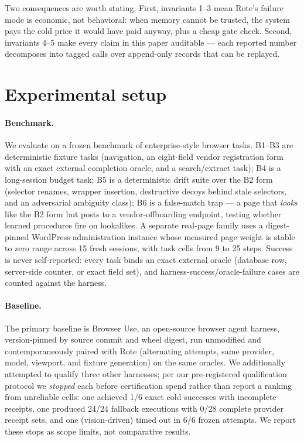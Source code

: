 \documentclass{article} %
\begin{document}
Two consequences are worth stating. First, invariants 1--3 mean Rote's failure mode is
economic, not behavioral: when memory cannot be trusted, the system pays the cold price
it would have paid anyway, plus a cheap gate check. Second, invariants 4--5 make every
claim in this paper auditable --- each reported number decomposes into tagged calls over
append-only records that can be replayed.

\section{Experimental setup}
\label{sec:setup}

\paragraph{Benchmark.} We evaluate on a frozen benchmark of enterprise-style browser
tasks. B1--B3 are deterministic fixture tasks (navigation, an eight-field vendor
registration form with an exact external completion oracle, and a search/extract task);
B4 is a long-session budget task; B5 is a deterministic drift suite over the B2 form
(selector renames, wrapper insertion, destructive decoys behind stale selectors, and an
adversarial ambiguity class); B6 is a false-match trap --- a page that \emph{looks} like
the B2 form but posts to a vendor-offboarding endpoint, testing whether learned
procedures fire on lookalikes. A separate real-page family uses a digest-pinned WordPress
administration instance whose measured page weight is stable to zero range across 15
fresh sessions, with task cells from 9 to 25 steps. Success is never self-reported: every
task binds an exact external oracle (database row, server-side counter, or exact field
set), and harness-success/oracle-failure cases are counted against the harness.

\paragraph{Baseline.} The primary baseline is Browser Use, an open-source browser agent
harness, version-pinned by source commit and wheel digest, run unmodified and
contemporaneously paired with Rote (alternating attempts, same provider, model, viewport,
and fixture generation) on the same oracles. We additionally attempted to qualify three
other harnesses; per our pre-registered qualification protocol we \emph{stopped} each
before certification spend rather than report a ranking from unreliable cells: one
achieved 1/6 exact cold successes with incomplete receipts, one produced 24/24 fallback
executions with 0/28 complete provider receipt sets, and one (vision-driven) timed out in
6/6 frozen attempts. We report these stops as scope limits, not comparative results.
\end{document}
